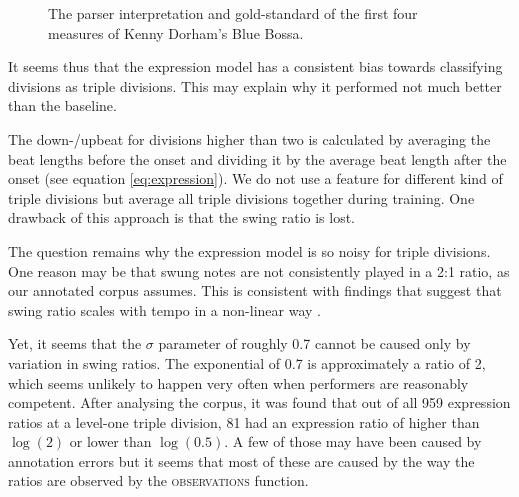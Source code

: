 \begin{figure}
\centering
{}

\caption{The parser interpretation and gold-standard of the first four measures of Kenny Dorham's Blue Bossa.}
\label{fig:blue_bossa}
\end{figure}

It seems thus that the expression model has a consistent bias towards classifying divisions as triple divisions. This may explain why it performed not much better than the baseline.

The down-/upbeat for divisions higher than two is calculated by averaging the beat lengths before the onset and dividing it by the average beat length after the onset (see equation \ref{eq:expression}). We do not use a feature for different kind of triple divisions but average all triple divisions together during training. One drawback of this approach is that the swing ratio is lost.

The question remains why the expression model is so noisy for triple divisions. One reason may be that swung notes are not consistently played in a 2:1 ratio, as our annotated corpus assumes. This is consistent with findings that suggest that swing ratio scales with tempo in a non-linear way \citep{honing2008swing}.

Yet, it seems that the $\sigma$ parameter of roughly 0.7 cannot be caused only by variation in swing ratios. The exponential of 0.7 is approximately a ratio of 2, which seems unlikely to happen very often when performers are reasonably competent. After analysing the corpus, it was found that out of all 959 expression ratios at a level-one triple division, 81 had an expression ratio of higher than $\log(2)$ or lower than $\log(0.5)$. A few of those may have been caused by annotation errors but it seems that most of these are caused by the way the ratios are observed by the \textsc{observations} function.

